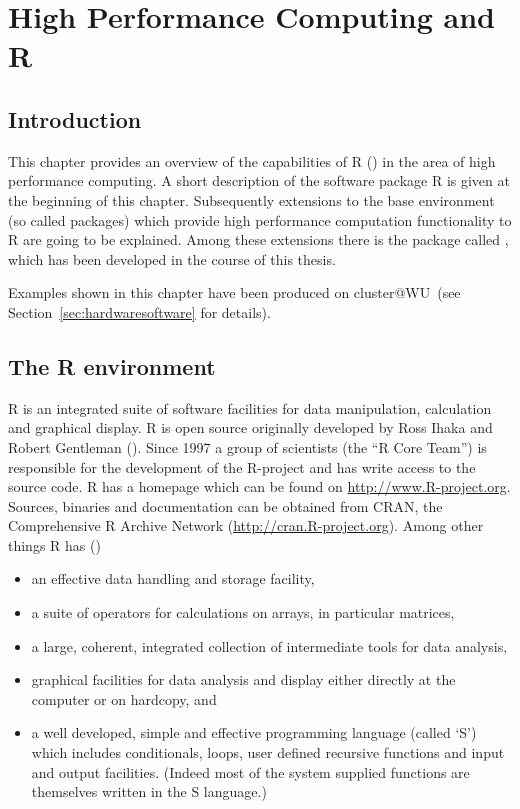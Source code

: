 \chapter{High Performance Computing and R}
\label{chap:Rhpc}
\section{Introduction}

This chapter provides an overview of the capabilities of R
(\cite{Rcore07R}) in the area 
of high performance computing. A short description of the
software package R is given at the beginning of this
chapter. Subsequently extensions to the base environment 
(so called packages) which provide high performance computation
functionality to 
R are going to be explained. Among these extensions there is the
package called , which has been developed in the course of
this thesis.

Examples shown in this chapter have been produced on cluster@WU~(see
Section~\ref{sec:hardwaresoftware} for details).  

\section{The R environment}

R is an integrated suite of software facilities for data manipulation,
calculation and graphical display. R is open source originally
developed by Ross Ihaka and Robert Gentleman
(\cite{ihaka96rld}). Since 1997 a group of scientists (the
``R Core Team'') is responsible for the development of the R-project
and has write access to the source code. R has a homepage
which can be found on \url{http://www.R-project.org}. Sources, binaries
and documentation can be obtained from CRAN, the Comprehensive R
Archive Network (\url{http://cran.R-project.org}). Among other things
R has (\cite{Rcore07R}) 
\begin{itemize}
\item an effective data handling and storage facility,
\item a suite of operators for calculations on arrays, in particular matrices,
\item a large, coherent, integrated collection of intermediate tools
  for data analysis,
\item graphical facilities for data analysis and display either
  directly at the computer or on hardcopy, and
\item a well developed, simple and effective programming language
  (called `S') which includes conditionals, loops, user defined
  recursive functions and input and output facilities. (Indeed most of
  the system supplied functions are themselves written in the S
  language.)
\end{itemize}

